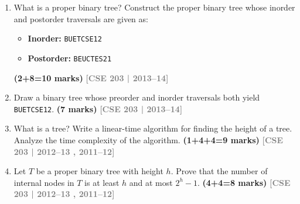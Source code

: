 \documentclass[12pt,a3paper]{article}
\newcommand{\yr}[1]{\hfill\textcolor{gray}{\small\textbf{[#1]}}}
\newcommand{\mk}[1]{\textcolor{orange!70!black}{\small\textbf{(#1 marks)}}}
\begin{document}
\begin{enumerate}

\item What is a proper binary tree? Construct the proper binary tree whose inorder and postorder traversals are given as:
\begin{itemize}
  \item \textbf{Inorder:} \texttt{BUETCSE12}
  \item \textbf{Postorder:} \texttt{BEUCTES21}
\end{itemize}
\mk{2+8=10}
\yr{CSE 203 | 2013--14}

\item Draw a binary tree whose preorder and inorder traversals both yield \texttt{BUETCSE12}. \mk{7}
\yr{CSE 203 | 2013--14}

\item What is a tree? Write a linear-time algorithm for finding the height of a tree. Analyze the time complexity of the algorithm. \mk{1+4+4=9}
\yr{CSE 203 | 2012--13 , 2011--12}

\item Let $T$ be a proper binary tree with height $h$. Prove that the number of internal nodes in $T$ is at least $h$ and at most $2^h - 1$. \mk{4+4=8}
\yr{CSE 203 | 2012--13 , 2011--12}


\end{enumerate}
\end{document}
